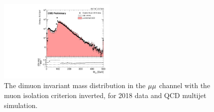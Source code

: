 \begin{figure}
\centering
\includegraphics[width=0.5\textwidth]{figures/bg/mumuInvMass_qcd_vs_data.pdf}
\caption{The dimuon invariant mass distribution in the ${\mu}{\mu}$ channel with the muon isolation criterion inverted, for 2018 data and QCD multijet simulation.
}
\label{mumu_inv_mass_inverted_iso}
\end{figure}